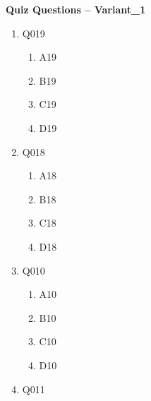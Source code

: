 \documentclass[12pt]{article}
\begin{document}
\begin{center}
    \Large\textbf{Quiz Questions -- Variant\_1}
\end{center}

\begin{enumerate}

    \item Q019
    \begin{enumerate}[label=(\Alph*)]
        
        \item A19
        
        \item B19
        
        \item C19
        
        \item D19
        
    \end{enumerate}

    \item Q018
    \begin{enumerate}[label=(\Alph*)]
        
        \item A18
        
        \item B18
        
        \item C18
        
        \item D18
        
    \end{enumerate}

    \item Q010
    \begin{enumerate}[label=(\Alph*)]
        
        \item A10
        
        \item B10
        
        \item C10
        
        \item D10
        
    \end{enumerate}

    \item Q011
    \begin{enumerate}[label=(\Alph*)]
        

\end{enumerate}
\end{enumerate}
\end{document}

